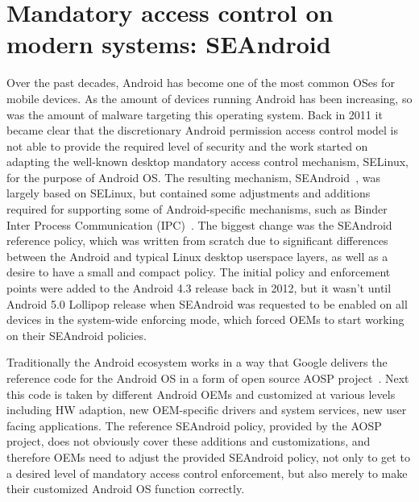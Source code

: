 \section{Mandatory access control on modern systems: SEAndroid}

Over the past decades, Android has become one of the most common OSes for mobile devices. As the amount of devices running Android has been increasing, so was the amount of malware targeting this operating system. Back in 2011 it became clear that the discretionary Android permission access control model is not able to provide the required level of security and the work started on adapting the well-known desktop mandatory access control mechanism, SELinux, for the purpose of Android OS. The resulting mechanism, SEAndroid~\cite{smalley12}, was largely based on SELinux, but contained some adjustments and additions required for supporting some of Android-specific mechanisms, such as Binder Inter Process Communication (IPC)~\cite{binder}. The biggest change was the SEAndroid reference policy, which was written from scratch due to significant differences between the Android and typical Linux desktop userspace layers, as well as a desire to have a small and compact policy. The initial policy and enforcement points were added to the Android 4.3 release back in 2012, but it wasn't until Android 5.0 Lollipop release when SEAndroid was requested to be enabled on all devices in the system-wide enforcing mode, which forced OEMs to start working on their SEAndroid policies. 

Traditionally the Android ecosystem works in a way that Google delivers the reference code for the Android OS in a form of open source AOSP project~\cite{aosp}. Next this code is taken by different Android OEMs and customized at various levels including HW adaption, new OEM-specific drivers and system services, new user facing applications. The reference SEAndroid policy, provided by the AOSP project, does not obviously cover these additions and customizations, and therefore OEMs need to adjust the provided SEAndroid policy, not only to get to a desired level of mandatory access control enforcement, but also merely to make their customized Android OS function correctly.

